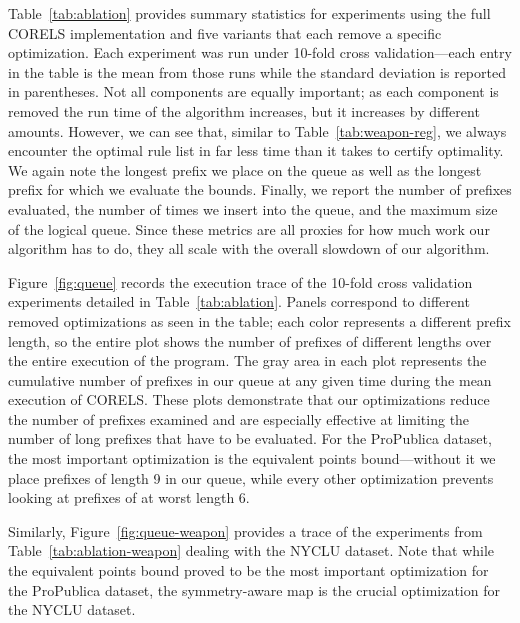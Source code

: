 Table~\ref{tab:ablation} provides summary statistics for experiments using the full
CORELS implementation and five variants that each remove a specific optimization.
%
Each experiment was run under 10-fold cross validation---each entry in the table is the mean from those 
runs while the standard deviation is reported in parentheses. 
%
Not all components are equally important; as each component is removed the run time of the algorithm increases,
but it increases by different amounts.
%
However, we can see that, similar to Table~\ref{tab:weapon-reg}, we always encounter the optimal rule list in far less
time than it takes to certify optimality.
%
We again note the longest prefix we place on the queue as well as the longest prefix for which we evaluate the bounds.
%
Finally, we report the number of prefixes evaluated, the number of times we insert into the queue, and the maximum size
of the logical queue.
%
Since these metrics are all proxies for how much work our algorithm has to do, they all scale with the overall slowdown 
of our algorithm.

Figure~\ref{fig:queue} records the execution trace of the 10-fold cross validation experiments detailed in Table~\ref{tab:ablation}.
%
Panels correspond to different removed optimizations as seen in the table; each color represents a different prefix length,
so the entire plot shows the number of prefixes of different lengths over the entire execution of the program.
%
The gray area in each plot represents the cumulative number of prefixes in our queue at any given time during the mean execution
of CORELS.
%
These plots demonstrate that our optimizations reduce the number of prefixes examined and are especially effective at 
limiting the number of long prefixes that have to be evaluated.
%
For the ProPublica dataset, the most important optimization is the equivalent points bound---without it we place prefixes of 
length 9 in our queue, while every other optimization prevents looking at prefixes of at worst length 6.

Similarly, Figure~\ref{fig:queue-weapon} provides a trace of the experiments from Table~\ref{tab:ablation-weapon} dealing with the NYCLU dataset.
%
Note that while the equivalent points bound proved to be the most important optimization for the ProPublica dataset,
the symmetry-aware map is the crucial optimization for the NYCLU dataset.


